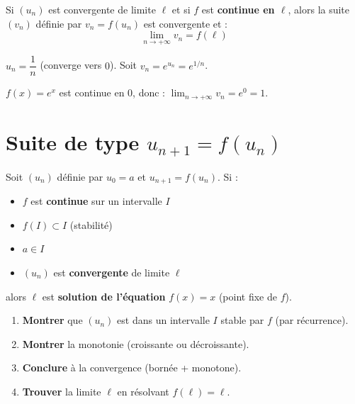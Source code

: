 \begin{theoreme}
  Si $(u_n)$ est convergente de limite $\ell$ et si $f$ est
  \textbf{continue en $\ell$}, alors la suite $(v_n)$ d\'{e}finie par
  $v_n = f(u_n)$ est convergente et :
  \[
    \lim_{n \to +\infty} v_n = f(\ell)
  \]
\end{theoreme}

\begin{exemple}[R\'{e}solu]
  $u_n = \dfrac{1}{n}$ (converge vers $0$).
  Soit $v_n = e^{u_n} = e^{1/n}$.

  $f(x) = e^x$ est continue en $0$, donc :
  $\displaystyle\lim_{n\to+\infty} v_n = e^0 = 1$.
\end{exemple}

\section{Suite de type \texorpdfstring{$u_{n+1} = f(u_n)$}{u\_{n+1} = f(u\_n)}}

\begin{theoreme}
  Soit $(u_n)$ d\'{e}finie par $u_0 = a$ et $u_{n+1} = f(u_n)$.
  Si :
  \begin{itemize}
    \item $f$ est \textbf{continue} sur un intervalle $I$
    \item $f(I) \subset I$ \quad (stabilit\'{e})
    \item $a \in I$
    \item $(u_n)$ est \textbf{convergente} de limite $\ell$
  \end{itemize}
  alors $\ell$ est \textbf{solution de l'\'{e}quation} $f(x) = x$
  (point fixe de $f$).
\end{theoreme}

\begin{methode}[\'{E}tudier une suite r\'{e}currente $u_{n+1} = f(u_n)$]
  \begin{enumerate}
    \item \textbf{Montrer} que $(u_n)$ est dans un intervalle $I$
          stable par $f$ (par r\'{e}currence).
    \item \textbf{Montrer} la monotonie (croissante ou d\'{e}croissante).
    \item \textbf{Conclure} \`{a} la convergence (born\'{e}e + monotone).
    \item \textbf{Trouver} la limite $\ell$ en r\'{e}solvant $f(\ell) = \ell$.
  \end{enumerate}
\end{methode}

